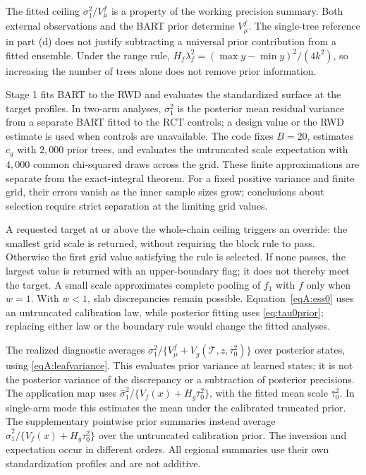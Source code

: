 \begin{remA}\label{rem:units}
The fitted ceiling $\sigma_1^2/V_\mu^f$ is a property of the working precision summary. Both external observations and the BART prior determine $V_\mu^f$. The single-tree reference in part (d) does not justify subtracting a universal prior contribution from a fitted ensemble. Under the range rule, $H_f\lambda_f^2=(\max y-\min y)^2/(4k^2)$, so increasing the number of trees alone does not remove prior information.
\end{remA}

\begin{remark}
Stage 1 fits BART to the RWD and evaluates the standardized surface at the target profiles. In two-arm analyses, $\sigma_1^2$ is the posterior mean residual variance from a separate BART fitted to the RCT controls; a design value or the RWD estimate is used when controls are unavailable. The code fixes $B=20$, estimates $c_g$ with $2{,}000$ prior trees, and evaluates the untruncated scale expectation with $4{,}000$ common chi-squared draws across the grid. These finite approximations are separate from the exact-integral theorem. For a fixed positive variance and finite grid, their errors vanish as the inner sample sizes grow; conclusions about selection require strict separation at the limiting grid values.

A requested target at or above the whole-chain ceiling triggers an override: the smallest grid scale is returned, without requiring the block rule to pass. Otherwise the first grid value satisfying the rule is selected. If none passes, the largest value is returned with an upper-boundary flag; it does not thereby meet the target. A small scale approximates complete pooling of $f_1$ with $f$ only when $w=1$. With $w<1$, slab discrepancies remain possible. Equation~\eqref{eqA:ess0} uses an untruncated calibration law, while posterior fitting uses \eqref{eq:tau0prior}; replacing either law or the boundary rule would change the fitted analyses.

The realized diagnostic averages $\sigma_1^2/\{V_\mu^f+V_g(\mathcal T,z,\tau_0^2)\}$ over posterior states, using \eqref{eqA:leafvariance}. This evaluates prior variance at learned states; it is not the posterior variance of the discrepancy or a subtraction of posterior precisions. The application map uses $\hat\sigma_1^2/\{V_f(x)+H_g\bar\tau_0^2\}$, with the fitted mean scale $\bar\tau_0^2$. In single-arm mode this estimates the mean under the calibrated truncated prior. The supplementary pointwise prior summaries instead average $\hat\sigma_1^2/\{V_f(x)+H_g\tau_0^2\}$ over the untruncated calibration prior. The inversion and expectation occur in different orders. All regional summaries use their own standardization profiles and are not additive.
\end{remark}

